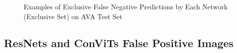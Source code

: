 \begin{figure}[ht!]
    \caption{Examples of Exclusive False Negative Predictions by Each Network (Exclusive Set) on AVA Test Set }
    \label{fig:true_positive}

\end{figure}
\subsection{ResNets and ConViTs False Positive Images}
\label{qualitative false positive}
